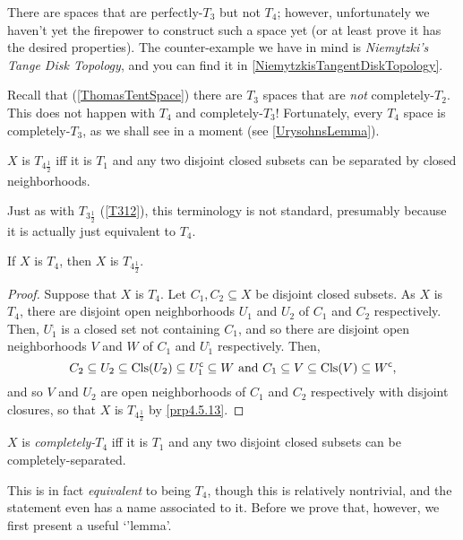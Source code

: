 There are spaces that are perfectly-$T_3$ but not $T_4$; however, unfortunately we haven't yet the firepower to construct such a space yet (or at least prove it has the desired properties).  The counter-example we have in mind is \emph{Niemytzki's Tange Disk Topology}, and you can find it in \cref{NiemytzkisTangentDiskTopology}.

Recall that (\cref{ThomasTentSpace}) there are $T_3$ spaces that are \emph{not} completely-$T_2$.  This does not happen with $T_4$ and completely-$T_3$!  Fortunately, every $T_4$ space is completely-$T_3$, as we shall see in a moment (see \cref{UrysohnsLemma}).
\begin{dfn}[$T_{4\frac{1}{2}}$]\label{T412}
$X$ is \emph{$T_{4\frac{1}{2}}$} iff it is $T_1$ and any two disjoint closed subsets can be separated by closed neighborhoods.
\begin{rmk}
Just as with $T_{3\frac{1}{2}}$ (\cref{T312}), this terminology is not standard, presumably because it is actually just equivalent to $T_4$.
\end{rmk}
\end{dfn}
\begin{prp}\label{prp4.5.88}
If $X$ is $T_4$, then $X$ is $T_{4\frac{1}{2}}$.
\begin{proof}
Suppose that $X$ is $T_4$.  Let $C_1,C_2\subseteq X$ be disjoint closed subsets.  As $X$ is $T_4$, there are disjoint open neighborhoods $U_1$ and $U_2$ of $C_1$ and $C_2$ respectively.  Then, $U_1^{\comp}$ is a closed set not containing $C_1$, and so there are disjoint open neighborhoods $V$ and $W$ of $C_1$ and $U_1^{\comp}$ respectively.  Then,
\begin{equation}
C_2\subseteq U_2\subseteq \operatorname{Cls} (U_2)\subseteq U_1^{\mathsf{c}}\subseteq W\text{ and }C_1\subseteq V\subseteq \operatorname{Cls} (V)\subseteq W^{\mathsf{c}},
\end{equation}
and so $V$ and $U_2$ are open neighborhoods of $C_1$ and $C_2$ respectively with disjoint closures, so that $X$ is $T_{4\frac{1}{2}}$ by \cref{prp4.5.13}.
\end{proof}
\end{prp}
\begin{dfn}[Completely-$T_4$]\label{CompletelyT4}
$X$ is \emph{completely-$T_4$} iff it is $T_1$ and any two disjoint closed subsets can be completely-separated.
\end{dfn}
This is in fact \emph{equivalent} to being $T_4$, though this is relatively nontrivial, and the statement even has a name associated to it.  Before we prove that, however, we first present a useful `'lemma'.
